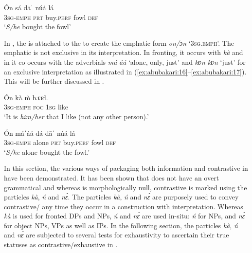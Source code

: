 \documentclass[output=paper,modfonts,nonflat,
 hidelinks
]{langsci/langscibook}
\begin{document}
 
\ea\label{ex:abubakari:15}  
\gll \'{O}n    sá  dāˈ    núá  lá\\
3\textsc{sg}-\textsc{emph}  \textsc{prt}  buy.\textsc{perf}  fowl  \textsc{def}\\
\glt ‘\textit{S/he} bought the fowl’    
\z 

In , the  is attached to the  to create the emphatic form \textit{on/ɔn} ‘3\textsc{sg}.\textsc{emph}’. The emphatic  is not exclusive in its interpretation. In fronting, it occurs with \textit{kà} and in  it co-occurs with the adverbials \textit{máˈáá} ‘alone, only, just’ and \textit{kʋn-kʋn} ‘just’ for an exclusive interpretation as illustrated in (\ref{ex:abubakari:16}--\ref{ex:abubakari:17}). This will be further discussed in .

 
\ea\label{ex:abubakari:16} 
\gll \'{O}n    kà  \`{m}  bɔ̄ɔ̄d.\\
3\textsc{sg}-\textsc{emph}  \textsc{foc}  1\textsc{sg}  like\\
\glt ‘It is \textit{him/her} that I like (not any other person).’
\z
 
\ea\label{ex:abubakari:17} 
\gll \'{O}n    máˈáá  dá  dāˈ    núá  lá\\
3\textsc{sg}-\textsc{emph}  alone  \textsc{prt}  buy.\textsc{perf}  fowl  \textsc{def}\\
\glt ‘\textit{S/he} alone bought the fowl.’
\z

 
In this section, the various ways of packaging both information and contrastive  in  have been demonstrated. It has been shown that  does not have an overt grammatical  and whereas  is morphologically null, contrastive  is marked using the particles \textit{kà}, \textit{ń} and \textit{nɛ́}. The particles \textit{kà}, \textit{ń} and \textit{nɛ́} are purposely used to convey contrastive{\slash} any time they occur in a construction with  interpretation. Whereas \textit{kà} is used for fronted DPs and NPs, \textit{ń} and \textit{nɛ́} are used in-situ: \textit{ń} for  NPs, and \textit{nɛ́} for object NPs, VPs as well as IPs. In the following section, the particles \textit{kà}, \textit{ń} and \textit{nɛ́} are subjected to several tests for exhaustivity to ascertain their true statuses as contrastive{\slash}exhaustive  in .
 
\end{document}
